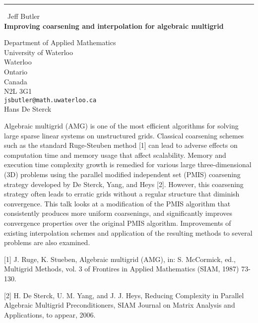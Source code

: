 \documentclass{report}
\begin{document}
\begin{center}
\rule{6in}{1pt} \
{\large Jeff Butler \\
{\bf Improving coarsening and interpolation for algebraic multigrid}}

Department of Applied Mathematics \\ University of Waterloo \\ Waterloo \\ Ontario \\ Canada \\ N2L 3G1
\\
{\tt jsbutler@math.uwaterloo.ca}\\
Hans De Sterck\end{center}

Algebraic multigrid (AMG) is one of the most efficient algorithms for
solving large sparse linear systems on unstructured grids. Classical
coarsening schemes such as the standard Ruge-Steuben method [1] can lead
to adverse effects on computation time and memory usage that affect
scalability. Memory and execution time complexity growth is remedied for
various large three-dimensional (3D) problems using the parallel modified
independent set (PMIS) coarsening strategy
developed by De Sterck, Yang, and Heys [2]. However, this
coarsening strategy often leads to erratic grids without a regular
structure that diminish convergence. This talk looks at a modification of
the PMIS algorithm that consistently produces more uniform coarsenings,
and significantly improves convergence properties over the original PMIS
algorithm. Improvements of existing interpolation schemes and application
of the resulting methods to several problems are also examined.


[1] J. Ruge, K. Stueben, Algebraic multigrid (AMG), in: S. McCormick,
ed., Multigrid Methods, vol. 3 of Frontires in Applied Mathematics (SIAM,
1987) 73-130.

[2] H. De Sterck, U. M. Yang, and J. J. Heys, Reducing Complexity in
Parallel Algebraic Multigrid Preconditioners, SIAM Journal on Matrix
Analysis and Applications, to appear, 2006.
\end{document}
